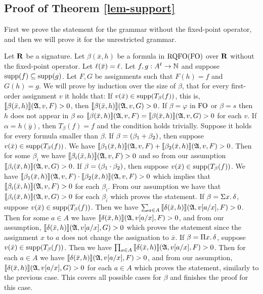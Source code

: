 
\subsection*{Proof of Theorem \ref{lem-support}}

First we prove the statement for the grammar without the fixed-point operator, and then we will prove it for the unrestricted grammar.

Let $\mathbf{R}$ be a signature. Let $\beta(\bar{x},h)$ be a formula in ${\rm RQFO}({\rm FO})$ over $\mathbf{R}$ without the fixed-point operator. Let $\ell(\bar{x}) = \ell$. Let $f,g :A^{\ell}\to\mathbb{N}$ and suppose $\text{\rm supp}(f) \subseteq \text{\rm supp}(g)$. Let $F,G$ be assignments such that $F(h) = f$ and $G(h) = g$. We will prove by induction over the size of $\beta$, that for every first-order assignment $v$ it holds that: If $v(\bar{x})\in\text{\rm supp}(T_{\beta}(f))$, this is, ${\llbracket{}{\beta(\bar{x},h)}\rrbracket}(\mathfrak{A},v,F) > 0$, then ${\llbracket{}{\beta(\bar{x},h)}\rrbracket}(\mathfrak{A},v,G) > 0$.
If $\beta = \varphi$ in ${\rm FO}$ or $\beta = s$ then $h$ does not appear in $\beta$ so ${\llbracket{}{\beta(\bar{x},h)}\rrbracket}(\mathfrak{A},v,F) = {\llbracket{}{\beta(\bar{x},h)}\rrbracket}(\mathfrak{A},v,G) > 0$ for each $v$. If $\alpha = h(\bar{y})$, then $T_{\beta}(f) = f$ and the condition holds trivially. Suppose it holds for every formula smaller than $\beta$. If $\beta = (\beta_1 + \beta_2)$, then suppose $v(\bar{x})\in\text{\rm supp}(T_{\beta}(f))$. We have ${\llbracket{}{\beta_1(\bar{x},h)}\rrbracket}(\mathfrak{A},v,F) + {\llbracket{}{\beta_2(\bar{x},h)}\rrbracket}(\mathfrak{A},v,F) > 0$. Then for some $\beta_i$ we have ${\llbracket{}{\beta_i(\bar{x},h)}\rrbracket}(\mathfrak{A},v,F) > 0$ and so from our assumption ${\llbracket{}{\beta_i(\bar{x},h)}\rrbracket}(\mathfrak{A},v,G) > 0$. 
If $\beta = (\beta_1 \cdot \beta_2)$, then suppose $v(\bar{x})\in\text{\rm supp}(T_{\beta}(f))$. We have ${\llbracket{}{\beta_1(\bar{x},h)}\rrbracket}(\mathfrak{A},v,F) \cdot {\llbracket{}{\beta_2(\bar{x},h)}\rrbracket}(\mathfrak{A},v,F) > 0$ which implies that ${\llbracket{}{\beta_i(\bar{x},h)}\rrbracket}(\mathfrak{A},v,F) > 0$ for each $\beta_i$. From our assumption we have that ${\llbracket{}{\beta_i(\bar{x},h)}\rrbracket}(\mathfrak{A},v,G) > 0$ for each $\beta_i$ which proves the statement. If $\beta = \Sigma{x}.\,\delta$, suppose $v(\bar{x})\in\text{\rm supp}(T_{\beta}(f))$. Then we have $\sum_{a\in A}{\llbracket{}{\delta(\bar{x},h)}\rrbracket}(\mathfrak{A},v[a/x],F) > 0$. Then for some $a\in A$ we have ${\llbracket{}{\delta(\bar{x},h)}\rrbracket}(\mathfrak{A},v[a/x],F) > 0$, and from our assumption, ${\llbracket{}{\delta(\bar{x},h)}\rrbracket}(\mathfrak{A},v[a/x],G) > 0$ which proves the statement since the assignment $x$ to $a$ does not change the assignation to $\bar{x}$. If $\beta = \Pi{x}.\,\delta$, suppose $v(\bar{x})\in\text{\rm supp}(T_{\beta}(f))$.
Then we have $\prod_{a\in A}{\llbracket{}{\delta(\bar{x},h)}\rrbracket}(\mathfrak{A},v[a/x],F) > 0$. Then for each $a\in A$ we have ${\llbracket{}{\delta(\bar{x},h)}\rrbracket}(\mathfrak{A},v[a/x],F) > 0$, and from our assumption, ${\llbracket{}{\delta(\bar{x},h)}\rrbracket}(\mathfrak{A},v[a/x],G) > 0$ for each $a\in A$ which proves the statement, similarly to the previous case. This covers all possible cases for $\beta$ and finishes the proof for this case.

